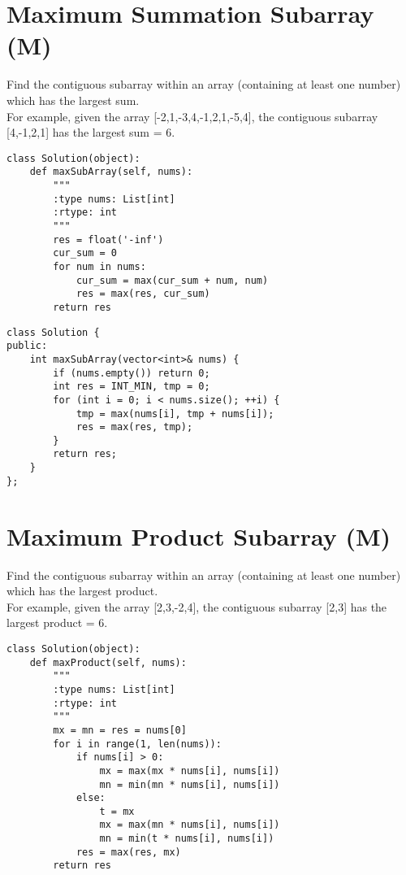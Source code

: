\section{Maximum Summation Subarray (M)}
Find the contiguous subarray within an array (containing at least one number) which has the largest sum.\\

For example, given the array [-2,1,-3,4,-1,2,1,-5,4], the contiguous subarray [4,-1,2,1] has the largest sum = 6. \\

\begin{lstlisting}
class Solution(object):
    def maxSubArray(self, nums):
        """
        :type nums: List[int]
        :rtype: int
        """
        res = float('-inf')
        cur_sum = 0
        for num in nums:
            cur_sum = max(cur_sum + num, num)
            res = max(res, cur_sum)
        return res
\end{lstlisting}

\begin{lstlisting}
class Solution {
public:
    int maxSubArray(vector<int>& nums) {
        if (nums.empty()) return 0;
        int res = INT_MIN, tmp = 0;
        for (int i = 0; i < nums.size(); ++i) {
            tmp = max(nums[i], tmp + nums[i]);
            res = max(res, tmp);
        }
        return res;
    }
};
\end{lstlisting}


\section{Maximum Product Subarray (M)}
Find the contiguous subarray within an array (containing at least one number) which has the largest product.\\

For example, given the array [2,3,-2,4], the contiguous subarray [2,3] has the largest product = 6. \\

\begin{lstlisting}
class Solution(object):
    def maxProduct(self, nums):
        """
        :type nums: List[int]
        :rtype: int
        """
        mx = mn = res = nums[0]
        for i in range(1, len(nums)):
            if nums[i] > 0:
                mx = max(mx * nums[i], nums[i])
                mn = min(mn * nums[i], nums[i])
            else:
                t = mx
                mx = max(mn * nums[i], nums[i])
                mn = min(t * nums[i], nums[i])
            res = max(res, mx)
        return res
\end{lstlisting}

